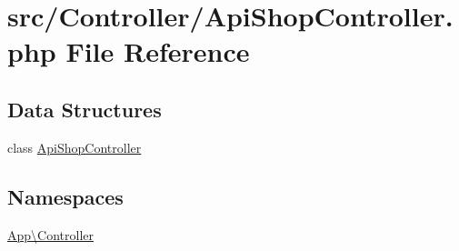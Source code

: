 \hypertarget{_api_shop_controller_8php}{}\section{src/\+Controller/\+Api\+Shop\+Controller.php File Reference}
\label{_api_shop_controller_8php}
\subsection*{Data Structures}
\begin{DoxyCompactItemize}
\item 
class \mbox{\hyperlink{class_app_1_1_controller_1_1_api_shop_controller}{Api\+Shop\+Controller}}
\end{DoxyCompactItemize}
\subsection*{Namespaces}
\begin{DoxyCompactItemize}
\item 
 \mbox{\hyperlink{namespace_app_1_1_controller}{App\textbackslash{}\+Controller}}
\end{DoxyCompactItemize}
